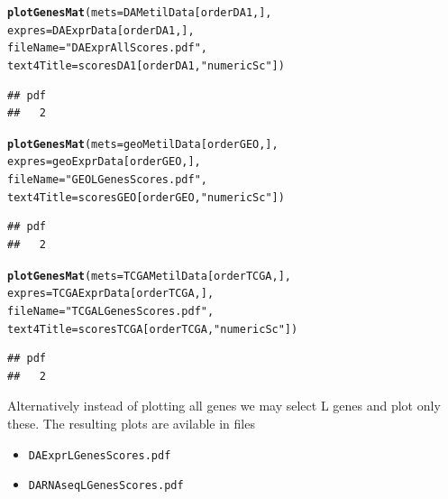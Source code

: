 \documentclass[a4paper,10pt]{article}\usepackage[]{graphicx}\usepackage[]{xcolor}
\makeatletter
\newcommand{\hlstr}[1]{\textcolor[rgb]{0.192,0.494,0.8}{#1}}%
\newcommand{\hlstd}[1]{\textcolor[rgb]{0.345,0.345,0.345}{#1}}%
\newcommand{\hlkwc}[1]{\textcolor[rgb]{0.333,0.667,0.333}{#1}}%
\newcommand{\hlkwd}[1]{\textcolor[rgb]{0.737,0.353,0.396}{\textbf{#1}}}%
\newenvironment{kframe}{%
 \def\at@end@of@kframe{}%
 \ifinner\ifhmode%
  \def\at@end@of@kframe{\end{minipage}}%
  \begin{minipage}{\columnwidth}%
 \fi\fi%
 \def\FrameCommand##1{\hskip\@totalleftmargin \hskip-\fboxsep
 \colorbox{shadecolor}{##1}\hskip-\fboxsep
     \hskip-\linewidth \hskip-\@totalleftmargin \hskip\columnwidth}%
 \MakeFramed {\advance\hsize-\width
   \@totalleftmargin\z@ \linewidth\hsize
   \@setminipage}}%
 {\par\unskip\endMakeFramed%
 \at@end@of@kframe}
\newenvironment{knitrout}{}{} %
\makeatother
\begin{document}
\begin{knitrout}
\color{fgcolor}\begin{kframe}
\begin{alltt}
\hlkwd{plotGenesMat} \hlstd{(}\hlkwc{mets}\hlstd{=DAMetilData[orderDA1,],}
              \hlkwc{expres}\hlstd{=DAExprData[orderDA1,],}
              \hlkwc{fileName} \hlstd{=}\hlstr{"DAExprAllScores.pdf"}\hlstd{,}
              \hlkwc{text4Title} \hlstd{= scoresDA1[orderDA1,}\hlstr{"numericSc"}\hlstd{])}
\end{alltt}
\begin{verbatim}
## pdf 
##   2
\end{verbatim}
\begin{alltt}
\hlkwd{plotGenesMat} \hlstd{(}\hlkwc{mets}\hlstd{=geoMetilData[orderGEO,],}
              \hlkwc{expres}\hlstd{=geoExprData[orderGEO,],}
              \hlkwc{fileName} \hlstd{=}\hlstr{"GEOLGenesScores.pdf"}\hlstd{,}
              \hlkwc{text4Title} \hlstd{= scoresGEO[orderGEO,}\hlstr{"numericSc"}\hlstd{])}
\end{alltt}
\begin{verbatim}
## pdf 
##   2
\end{verbatim}
\begin{alltt}
\hlkwd{plotGenesMat} \hlstd{(}\hlkwc{mets}\hlstd{=TCGAMetilData[orderTCGA,],}
              \hlkwc{expres}\hlstd{=TCGAExprData[orderTCGA,],}
              \hlkwc{fileName} \hlstd{=}\hlstr{"TCGALGenesScores.pdf"}\hlstd{,}
              \hlkwc{text4Title} \hlstd{= scoresTCGA[orderTCGA,}\hlstr{"numericSc"}\hlstd{])}
\end{alltt}
\begin{verbatim}
## pdf 
##   2
\end{verbatim}
\end{kframe}
\end{knitrout}

Alternatively instead of plotting all genes we may select L genes and plot only these.
The resulting plots are avilable in files 
\begin{itemize}
  \item \texttt{DAExprLGenesScores.pdf}
  \item \texttt{DARNAseqLGenesScores.pdf}
\end{itemize}
\end{document}
